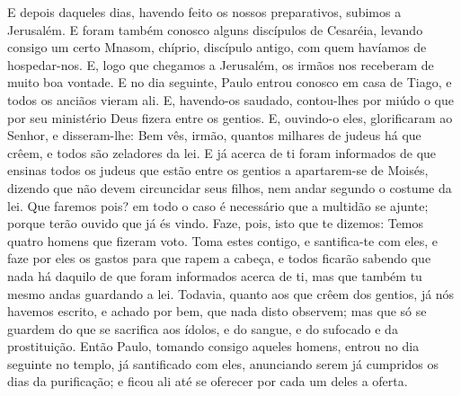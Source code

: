E depois daqueles dias, havendo feito os nossos preparativos,
subimos a Jerusalém. E foram também conosco alguns discípulos
de Cesaréia, levando consigo um certo Mnasom, chíprio, discípulo
antigo, com quem havíamos de hospedar-nos. E, logo que
chegamos a Jerusalém, os irmãos nos receberam de muito boa vontade.
E no dia seguinte, Paulo entrou conosco em casa de Tiago, e
todos os anciãos vieram ali. E, havendo-os saudado,
contou-lhes por miúdo o que por seu ministério Deus fizera entre os
gentios. E, ouvindo-o eles, glorificaram ao Senhor, e
disseram-lhe: Bem vês, irmão, quantos milhares de judeus há que
crêem, e todos são zeladores da lei. E já acerca de ti foram
informados de que ensinas todos os judeus que estão entre os gentios
a apartarem-se de Moisés, dizendo que não devem circuncidar seus
filhos, nem andar segundo o costume da lei. Que faremos pois?
em todo o caso é necessário que a multidão se ajunte; porque terão
ouvido que já és vindo. Faze, pois, isto que te dizemos:
Temos quatro homens que fizeram voto. Toma estes contigo, e
santifica-te com eles, e faze por eles os gastos para que rapem a
cabeça, e todos ficarão sabendo que nada há daquilo de que foram
informados acerca de ti, mas que também tu mesmo andas guardando a
lei. Todavia, quanto aos que crêem dos gentios, já nós
havemos escrito, e achado por bem, que nada disto observem; mas que
só se guardem do que se sacrifica aos ídolos, e do sangue, e do
sufocado e da prostituição. Então Paulo, tomando consigo
aqueles homens, entrou no dia seguinte no templo, já santificado com
eles, anunciando serem já cumpridos os dias da purificação; e ficou
ali até se oferecer por cada um deles a oferta.

